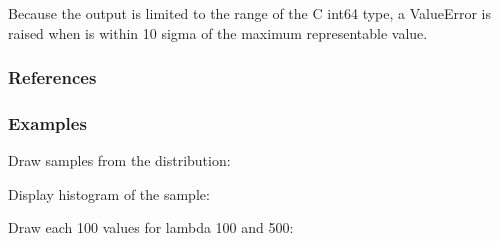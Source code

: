 \documentclass[letterpaper,10pt,english]{sphinxmanual}
\begin{document}
\begin{fulllineitems}
\sphinxAtStartPar
Because the output is limited to the range of the C int64 type, a
ValueError is raised when  is within 10 sigma of the maximum
representable value.
\subsubsection*{References}
\subsubsection*{Examples}

\sphinxAtStartPar
Draw samples from the distribution:

\begin{sphinxVerbatim}[commandchars=\\\{\}]
   
   
\end{sphinxVerbatim}

\sphinxAtStartPar
Display histogram of the sample:

\begin{sphinxVerbatim}[commandchars=\\\{\}]
   
      
\end{sphinxVerbatim}

\sphinxAtStartPar
Draw each 100 values for lambda 100 and 500:

\begin{sphinxVerbatim}[commandchars=\\\{\}]
     
\end{sphinxVerbatim}

\end{fulllineitems}
\end{document}
